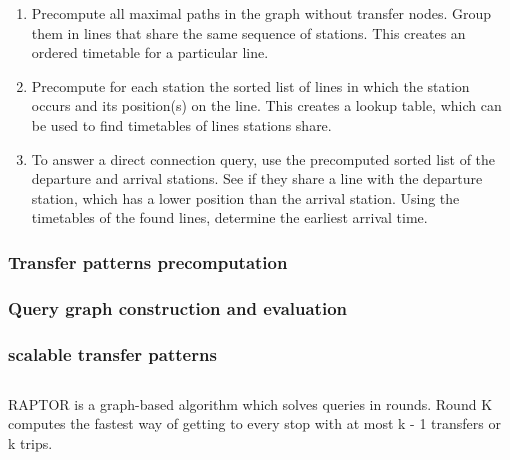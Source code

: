 \begin{enumerate}
    \item Precompute all maximal paths in the graph without transfer nodes. Group them in lines that share the same sequence of stations. This creates an ordered timetable for a particular line.
    \item Precompute for each station the sorted list of lines in which the station occurs and its position(s) on the line. This creates a lookup table, which can be used to find timetables of lines stations share.
    \item To answer a direct connection query, use the precomputed sorted list of the departure and arrival stations. See if they share a line with the departure station, which has a lower position than the arrival station. Using the timetables of the found lines, determine the earliest arrival time.
\end{enumerate}
\subsubsection{Transfer patterns precomputation}
\subsubsection{Query graph construction and evaluation}
\subsubsection{scalable transfer patterns}
\subsection{}
\subsection{}
RAPTOR is a graph-based algorithm which solves queries in rounds. Round K computes the fastest way of getting to every stop with at most k - 1 transfers or k trips.

